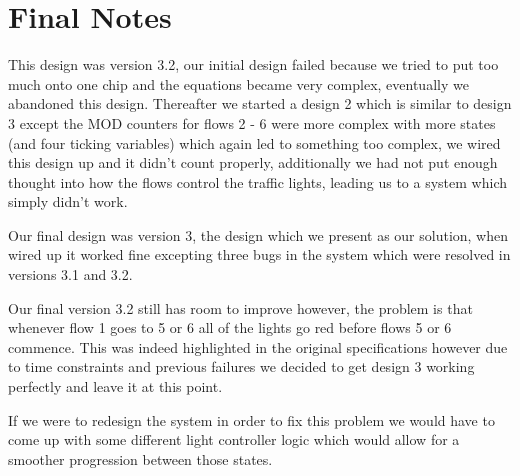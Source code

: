 \section{Final Notes}
This design was version 3.2, our initial design failed because we tried to put
too much onto one chip and the equations became very complex, eventually we
abandoned this design. Thereafter we started a design 2 which is similar to
design 3 except the MOD counters for flows 2 - 6 were more complex with more
states (and four ticking variables) which again led to something too complex,
we wired this design up and it didn’t count properly, additionally we had not
put enough thought into how the flows control the traffic lights, leading us to
a system which simply didn’t work. 

Our final design was version 3, the design which we present as our solution,
when wired up it worked fine excepting three bugs in the system which were
resolved in versions 3.1 and 3.2. 

Our final version 3.2 still has room to improve however, the problem is that
whenever flow 1 goes to 5 or 6 all of the lights go red before flows 5 or 6
commence. This was indeed highlighted in the original specifications however
due to time constraints and previous failures we decided to get design 3 working
perfectly and leave it at this point. 

If we were to redesign the system in order to fix this problem we would have to
come up with some different light controller logic which would allow for a
smoother progression between those states. 
